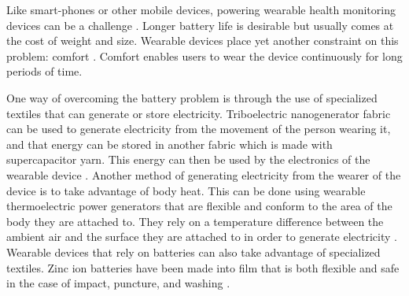 Like smart-phones or other mobile devices, powering wearable health monitoring
devices can be a challenge \cite{Pantelopoulos2010}.  Longer battery life is 
desirable but usually comes at the cost of weight and size.  
Wearable devices place yet another constraint on this problem: comfort 
\cite{Motti2014}.  Comfort enables users to wear the device continuously for 
long periods of time.  

One way of overcoming the battery problem is through the use of 
specialized textiles that can generate or store electricity.  Triboelectric 
nanogenerator fabric can be used to generate electricity from the movement of 
the person wearing it, and that energy can be stored in another fabric which 
is made with supercapacitor yarn.  This energy can then be used by the 
electronics of the wearable device \cite{Pu2016}.  Another method of generating 
electricity from the wearer of the device is to take advantage of body heat.  
This can be done using wearable thermoelectric power generators that are flexible 
and conform to the area of the body they are attached to.  They rely on a 
temperature difference between the ambient air and the surface they are attached 
to in order to generate electricity \cite{Siddique2017}.  Wearable devices that 
rely on batteries can also take advantage of specialized textiles.  Zinc ion 
batteries have been made into film that is both flexible and safe in the case 
of impact, puncture, and washing \cite{Li2018}.

